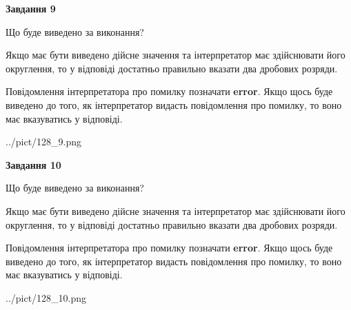 \documentclass[12pt, ukrainian]{article}
\begin{document}
{\begin {Large}
{\begin {center}\textbf{Завдання 9}\end {center}}\par
Що буде виведено за виконання? \par

Якщо має бути виведено дійсне значення та інтерпретатор має здійснювати його округлення, 
то у відповіді достатньо правильно вказати два дробових розряди.

Повідомлення інтерпретатора про помилку позначати \textbf{error}.
Якщо щось буде виведено до того, як інтерпретатор видасть повідомлення про помилку, 
то воно має вказуватись у відповіді. \par

\begin{center}
	{../pict/128_9.png}
\end{center}
\newpage

{\begin {center}\textbf{Завдання 10}\end {center}}\par
Що буде виведено за виконання? \par

Якщо має бути виведено дійсне значення та інтерпретатор має здійснювати його округлення, 
то у відповіді достатньо правильно вказати два дробових розряди.

Повідомлення інтерпретатора про помилку позначати \textbf{error}.
Якщо щось буде виведено до того, як інтерпретатор видасть повідомлення про помилку, 
то воно має вказуватись у відповіді. \par

\begin{center}
	{../pict/128_10.png}
\end{center}
\newpage

\end {Large}}
\end{document}
